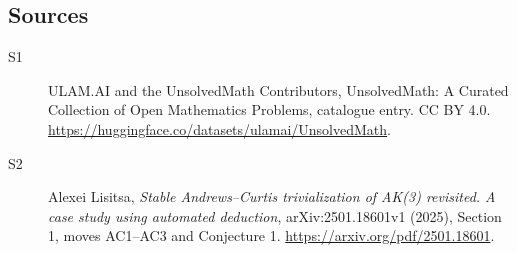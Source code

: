 \documentclass[11pt]{article}
\begin{document}
\subsection{Sources}
\begin{description}
\item[\hypertarget{source:statement:1}{S1}] ULAM.AI and the UnsolvedMath Contributors, UnsolvedMath: A Curated Collection of Open Mathematics Problems, catalogue entry. CC BY 4.0. \url{https://huggingface.co/datasets/ulamai/UnsolvedMath}.
\item[\hypertarget{source:statement:2}{S2}] Alexei Lisitsa, \emph{Stable Andrews--Curtis trivialization of AK(3) revisited. A case study using automated deduction}, arXiv:2501.18601v1 (2025), Section 1, moves AC1--AC3 and Conjecture 1. \url{https://arxiv.org/pdf/2501.18601}.
\end{description}
\label{end:statement}
\end{document}
